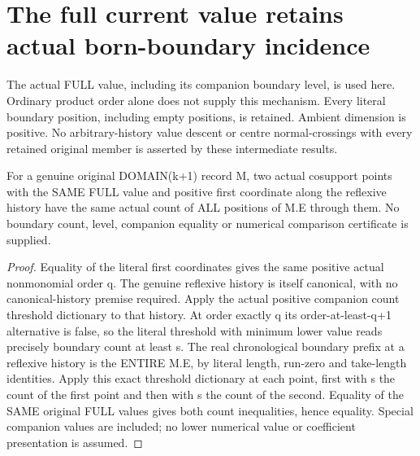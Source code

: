 \section{The full current value retains actual born-boundary incidence}

The actual FULL value, including its companion boundary level, is used here.
Ordinary product order alone does not supply this mechanism. Every literal
boundary position, including empty positions, is retained. Ambient dimension
is positive. No arbitrary-history value descent or centre normal-crossings
with every retained original member is asserted by these intermediate results.

\begin{theorem}
\label{hir:sharp-actual-full-refl-born-count-rigidity}
\leanok
For a genuine original DOMAIN(k+1) record M, two actual cosupport points
with the SAME FULL value and positive first coordinate along the reflexive history have the same
actual count of ALL positions of M.E through them. No boundary count, level,
companion equality or numerical comparison certificate is supplied.
\end{theorem}
\begin{proof}
Equality of the literal first coordinates gives the same positive actual
nonmonomial order q. The genuine reflexive history is itself canonical, with
no canonical-history premise required. Apply the actual positive companion
count threshold dictionary to that history. At order exactly q its
order-at-least-q+1 alternative is false, so the literal threshold with minimum
lower value reads precisely boundary count at least s. The real chronological
boundary prefix at a reflexive history is the ENTIRE M.E, by literal length,
run-zero and take-length identities. Apply this exact threshold dictionary
at each point, first with s the count of the first point and then with s the
count of the second. Equality of the SAME original FULL values gives both
count inequalities, hence equality. Special companion values are included;
no lower numerical value or coefficient presentation is assumed.
\end{proof}

